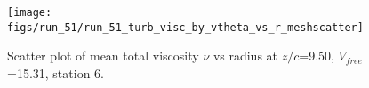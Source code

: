 \begin{figure}[H]
\centering
\texttt{[image: figs/run\_51/run\_51\_turb\_visc\_by\_vtheta\_vs\_r\_meshscatter]}
\caption{Scatter plot of mean total viscosity $\nu$ vs radius at $z/c$=9.50, $V_{free}$=15.31, station 6.}
\label{fig:run_51_turb_visc_by_vtheta_vs_r_meshscatter}
\end{figure}



